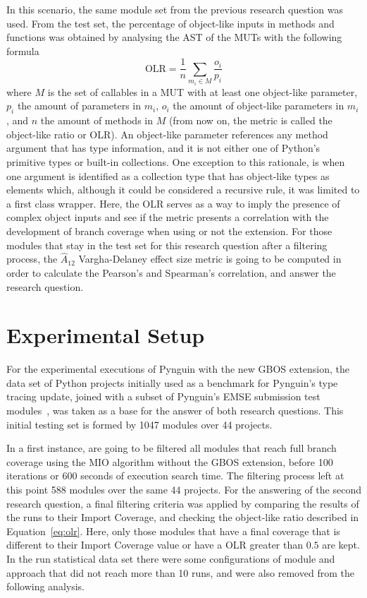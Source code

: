\documentclass[%
  chapterprefix=false,%
  open=right,%
  twoside=true,%
  paper=a4,%
  logofile={Figures/logo.png},%
  thesistype=master,%
  UKenglish,%
]{se2thesis}
\begin{document}
In this scenario, the same module set from the previous research question was used.
From the test set, the percentage of object-like inputs in methods and functions was obtained by analysing the AST of the MUTs with the following formula
\begin{equation}\label{eq:olr}
\text{OLR} = \frac{1}{n}\sum_{m_i \in M} \frac{o_i}{p_i}
\end{equation}
where \(M\) is the set of callables in a MUT with at least one object-like parameter, \(p_i\) the amount of parameters in \(m_i\), \(o_i\) the amount of object-like parameters in \(m_i\), and \(n\) the amount of methods in \(M\) (from now on, the metric is called the object-like ratio or OLR).
An object-like parameter references any method argument that has type information, and it is not either one of Python's primitive types or built-in collections.
One exception to this rationale, is when one argument is identified as a collection type that has object-like types as elements which, although it could be considered a recursive rule, it was limited to a first class wrapper.
Here, the OLR serves as a way to imply the presence of complex object inputs and see if the metric presents a correlation with the development of branch coverage when using or not the extension.
For those modules that stay in the test set for this research question after a filtering process, the \(\hat{A}_{12}\) Vargha-Delaney effect size metric is going to be computed in order to calculate the Pearson's and Spearman's correlation, and answer the research question. 

\section{Experimental Setup}\label{sec:experimental_setup}

For the experimental executions of Pynguin with the new GBOS extension, the data set of Python projects initially used as a benchmark for Pynguin's type tracing update, joined with a subset of Pynguin's EMSE submission test modules~\cite{DBLP:journals/corr/abs-2111-05003}, was taken as a base for the answer of both research questions.
This initial testing set is formed by 1047 modules over 44 projects.

In a first instance, are going to be filtered all modules that reach full branch coverage using the MIO algorithm without the GBOS extension, before 100 iterations or 600 seconds of execution search time.
The filtering process left at this point 588 modules over the same 44 projects.
For the answering of the second research question, a final filtering criteria was applied by comparing the  results of the runs to their Import Coverage, and checking the object-like ratio described in Equation~\ref{eq:olr}.
Here, only those modules that have a final coverage that is different to their Import Coverage value or have a OLR greater than \(0.5\) are kept.
In the run statistical data set there were some configurations of module and approach that did not reach more than 10 runs, and were also removed from the following analysis.
\end{document}
